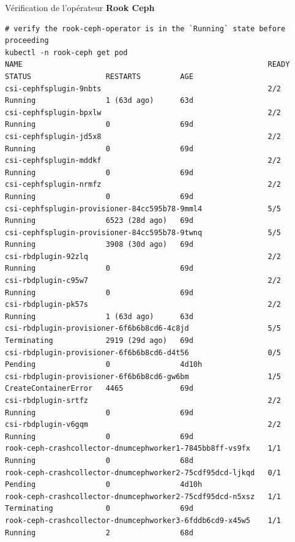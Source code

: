 \begin{frame}[shrink=5,fragile]{Vérification de l'opérateur \textbf{Rook Ceph}}

\begin{tiny}
\begin{Verbatim}[commandchars=\\\{\}]
# verify the rook-ceph-operator is in the `Running` state before proceeding
kubectl -n rook-ceph get pod
NAME                                                        READY   STATUS                 RESTARTS         AGE
csi-cephfsplugin-9nbts                                      2/2     Running                1 (63d ago)      63d
csi-cephfsplugin-bpxlw                                      2/2     Running                0                69d
csi-cephfsplugin-jd5x8                                      2/2     Running                0                69d
csi-cephfsplugin-mddkf                                      2/2     Running                0                69d
csi-cephfsplugin-nrmfz                                      2/2     Running                0                69d
csi-cephfsplugin-provisioner-84cc595b78-9mml4               5/5     Running                6523 (28d ago)   69d
csi-cephfsplugin-provisioner-84cc595b78-9twnq               5/5     Running                3908 (30d ago)   69d
csi-rbdplugin-92zlq                                         2/2     Running                0                69d
csi-rbdplugin-c95w7                                         2/2     Running                0                69d
csi-rbdplugin-pk57s                                         2/2     Running                1 (63d ago)      63d
csi-rbdplugin-provisioner-6f6b6b8cd6-4c8jd                  5/5     Terminating            2919 (29d ago)   69d
csi-rbdplugin-provisioner-6f6b6b8cd6-d4t56                  0/5     Pending                0                4d10h
csi-rbdplugin-provisioner-6f6b6b8cd6-gw6bm                  1/5     CreateContainerError   4465             69d
csi-rbdplugin-srtfz                                         2/2     Running                0                69d
csi-rbdplugin-v6gqm                                         2/2     Running                0                69d
rook-ceph-crashcollector-dnumcephworker1-7845bb8ff-vs9fx    1/1     Running                0                68d
rook-ceph-crashcollector-dnumcephworker2-75cdf95dcd-ljkqd   0/1     Pending                0                4d10h
rook-ceph-crashcollector-dnumcephworker2-75cdf95dcd-n5xsz   1/1     Terminating            0                69d
rook-ceph-crashcollector-dnumcephworker3-6fddb6cd9-x45w5    1/1     Running                2                68d

\end{Verbatim}
\end{tiny}
\end{frame}
